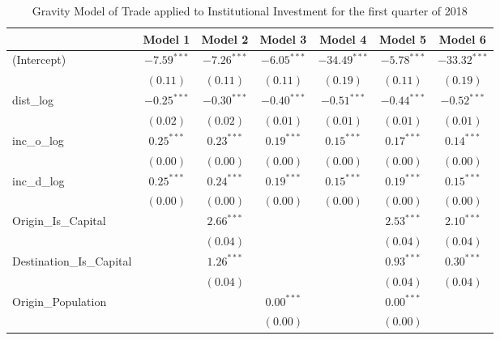 \begin{table}
	\begin{center}
		\caption[Gravity Model of trade for Q1 2018]{Gravity Model of Trade applied to Institutional Investment for the first quarter of 2018}
		\begin{tabular}{l c c c c c c }
			\hline
			& Model 1 & Model 2 & Model 3 & Model 4 & Model 5 & Model 6 \\
			\hline
			(Intercept)                  & $-7.59^{***}$ & $-7.26^{***}$ & $-6.05^{***}$ & $-34.49^{***}$ & $-5.78^{***}$ & $-33.32^{***}$ \\
			& $(0.11)$      & $(0.11)$      & $(0.11)$      & $(0.19)$       & $(0.11)$      & $(0.19)$       \\
			dist\_log                    & $-0.25^{***}$ & $-0.30^{***}$ & $-0.40^{***}$ & $-0.51^{***}$  & $-0.44^{***}$ & $-0.52^{***}$  \\
			& $(0.02)$      & $(0.02)$      & $(0.01)$      & $(0.01)$       & $(0.01)$      & $(0.01)$       \\
			inc\_o\_log                  & $0.25^{***}$  & $0.23^{***}$  & $0.19^{***}$  & $0.15^{***}$   & $0.17^{***}$  & $0.14^{***}$   \\
			& $(0.00)$      & $(0.00)$      & $(0.00)$      & $(0.00)$       & $(0.00)$      & $(0.00)$       \\
			inc\_d\_log                  & $0.25^{***}$  & $0.24^{***}$  & $0.19^{***}$  & $0.15^{***}$   & $0.19^{***}$  & $0.15^{***}$   \\
			& $(0.00)$      & $(0.00)$      & $(0.00)$      & $(0.00)$       & $(0.00)$      & $(0.00)$       \\
			Origin\_Is\_Capital          &               & $2.66^{***}$  &               &                & $2.53^{***}$  & $2.10^{***}$   \\
			&               & $(0.04)$      &               &                & $(0.04)$      & $(0.04)$       \\
			Destination\_Is\_Capital     &               & $1.26^{***}$  &               &                & $0.93^{***}$  & $0.30^{***}$   \\
			&               & $(0.04)$      &               &                & $(0.04)$      & $(0.04)$       \\
			Origin\_Population           &               &               & $0.00^{***}$  &                & $0.00^{***}$  &                \\
			&               &               & $(0.00)$      &                & $(0.00)$      &                \\

\end{tabular}
\end{center}
\end{table}
